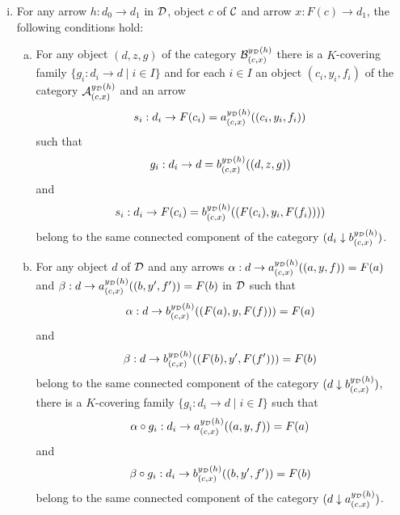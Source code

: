 \documentclass[a4paper,12pt]{article}
\begin{document}
\begin{theorem}
\begin{enumerate}[(i)]
		\item For any arrow $h:d_{0}\to d_{1}$ in $\cal D$, object $c$ of $\cal C$ and arrow $x:F(c)\to d_{1}$, the following conditions hold:
		\begin{enumerate}[(a)]
			\item For any object $(d, z, g)$ of the category ${\cal B}^{y_{\cal D}(h)}_{(c, x)}$ there is a $K$-covering family $\{g_{i}:d_{i}\to d \mid i\in I\}$ and for each $i\in I$ an object $(c_{i}, y_{i}, f_{i})$ of the category ${\cal A}^{y_{\cal D}(h)}_{(c, x)}$ and an arrow $$s_{i}:d_{i}\to F(c_{i})= a^{y_{\cal D}(h)}_{(c, x)}((c_{i}, y_{i}, f_{i}))$$ such that $$g_{i}:d_{i}\to d=b^{y_{\cal D}(h)}_{(c, x)}((d, z, g))$$ and $$s_{i}:d_{i}\to F(c_{i})=b^{y_{\cal D}(h)}_{(c, x)}((F(c_{i}), y_{i}, F(f_{i}))))$$ belong to the same connected component of the category $(d_{i}\downarrow b^{y_{\cal D}(h)}_{(c, x)})$. 
			
			\item For any object $d$ of $\cal D$ and any arrows $\alpha:d\to a^{y_{\cal D}(h)}_{(c, x)}((a, y, f))=F(a)$ and $\beta:d\to a^{y_{\cal D}(h)}_{(c, x)}((b, y', f'))=F(b)$ in $\cal D$ such that $$\alpha:d\to b^{y_{\cal D}(h)}_{(c, x)}((F(a), y, F(f)))=F(a)$$ and $$\beta:d\to b^{y_{\cal D}(h)}_{(c, x)}((F(b), y', F(f')))=F(b)$$ belong to the same connected component of the category $(d\downarrow b^{y_{\cal D}(h)}_{(c, x)})$, there is a $K$-covering family $\{g_i:d_i\to d\mid i\in I\}$ such that $$\alpha\circ g_{i}:d_{i}\to a^{y_{\cal D}(h)}_{(c, x)}((a, y, f))=F(a)$$ and $$\beta\circ g_i:d_{i}\to b^{y_{\cal D}(h)}_{(c, x)}((b, y', f'))=F(b)$$ belong to the same connected component of the category $(d\downarrow a^{y_{\cal D}(h)}_{(c, x)})$.
		\end{enumerate}
		
	\end{enumerate}
\end{theorem}
\end{document}
